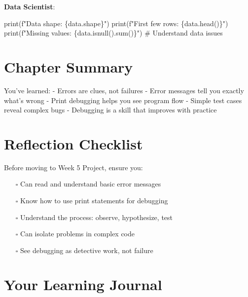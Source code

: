 \documentclass[
  letterpaper,
  DIV=11,
  numbers=noendperiod,
  oneside]{scrreprt}
\newenvironment{Shaded}{}{}
\newcommand{\BuiltInTok}[1]{\textcolor[rgb]{0.84,0.23,0.29}{#1}}
\newcommand{\CommentTok}[1]{\textcolor[rgb]{0.42,0.45,0.49}{#1}}
\newcommand{\NormalTok}[1]{\textcolor[rgb]{0.14,0.16,0.18}{#1}}
\newcommand{\SpecialCharTok}[1]{\textcolor[rgb]{0.00,0.36,0.77}{#1}}
\newcommand{\SpecialStringTok}[1]{\textcolor[rgb]{0.01,0.18,0.38}{#1}}
\providecommand{\tightlist}{%
  \setlength{\itemsep}{0pt}\setlength{\parskip}{0pt}}\usepackage{longtable,booktabs,array}
\begin{document}
\textbf{Data Scientist}:

\begin{Shaded}
\begin{Highlighting}[]
\BuiltInTok{print}\NormalTok{(}\SpecialStringTok{f"Data shape: }\SpecialCharTok{\{}\NormalTok{data}\SpecialCharTok{.}\NormalTok{shape}\SpecialCharTok{\}}\SpecialStringTok{"}\NormalTok{)}
\BuiltInTok{print}\NormalTok{(}\SpecialStringTok{f"First few rows: }\SpecialCharTok{\{}\NormalTok{data}\SpecialCharTok{.}\NormalTok{head()}\SpecialCharTok{\}}\SpecialStringTok{"}\NormalTok{)}
\BuiltInTok{print}\NormalTok{(}\SpecialStringTok{f"Missing values: }\SpecialCharTok{\{}\NormalTok{data}\SpecialCharTok{.}\NormalTok{isnull()}\SpecialCharTok{.}\BuiltInTok{sum}\NormalTok{()}\SpecialCharTok{\}}\SpecialStringTok{"}\NormalTok{)}
\CommentTok{\# Understand data issues}
\end{Highlighting}
\end{Shaded}

\section{Chapter Summary}\label{chapter-summary-9}

You've learned: - Errors are clues, not failures - Error messages tell
you exactly what's wrong - Print debugging helps you see program flow -
Simple test cases reveal complex bugs - Debugging is a skill that
improves with practice

\section{Reflection Checklist}\label{reflection-checklist-8}

Before moving to Week 5 Project, ensure you:

\begin{itemize}
\tightlist
\item[$\square$]
  Can read and understand basic error messages
\item[$\square$]
  Know how to use print statements for debugging
\item[$\square$]
  Understand the process: observe, hypothesize, test
\item[$\square$]
  Can isolate problems in complex code
\item[$\square$]
  See debugging as detective work, not failure
\end{itemize}

\section{Your Learning Journal}\label{your-learning-journal-9}
\end{document}
